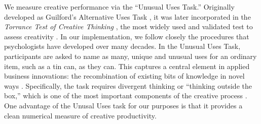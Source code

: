We measure creative performance via the ``Unusual Uses Task.''
Originally developed as Guilford's Alternative Uses Task \citep{Guilford67}, it was later 
 incorporated in the \textit{Torrance Test of Creative Thinking} \citep{Torrance1968,Torrance1998}, 
the most widely used and validated test to assess creativity \citep{kim2006}. In our implementation, we follow closely the procedures that psychologists have developed over many decades.
In the Unusual Uses Task, participants are asked to name as many, unique and unusual uses for an ordinary item, such as a tin can, as they can. 
This captures a central element in applied business
innovations: the recombination of existing bits of knowledge in novel 
ways \citep{Weitzman1998, woodman93, Simonton2004}.
Specifically, the task requires divergent thinking or ``thinking outside the box,''
which is one of the most important components of the creative process \citep{runco1991divergent}. 
One advantage of the Unusal Uses task for our purposes  is that it provides a clean numerical 
measure of creative productivity. 


